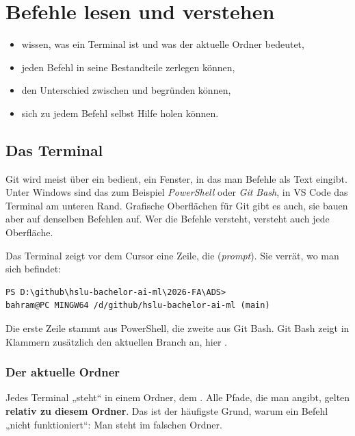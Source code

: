 \chapter{Befehle lesen und verstehen}
\label{kap:lesen}

\begin{lernziele}
\begin{itemize}[nosep]
  \item wissen, was ein Terminal ist und was der aktuelle Ordner bedeutet,
  \item jeden Befehl in seine Bestandteile zerlegen können,
  \item den Unterschied zwischen  und  begründen können,
  \item sich zu jedem Befehl selbst Hilfe holen können.
\end{itemize}
\end{lernziele}

\section{Das Terminal}

Git wird meist über ein  bedient, ein Fenster, in das man Befehle als Text
eingibt. Unter Windows sind das zum Beispiel \emph{PowerShell} oder \emph{Git Bash}, in VS Code
das Terminal am unteren Rand. Grafische Oberflächen für Git gibt es auch, sie bauen aber auf
denselben Befehlen auf. Wer die Befehle versteht, versteht auch jede Oberfläche.

Das Terminal zeigt vor dem Cursor eine Zeile, die 
(\emph{prompt}). Sie verrät, wo man sich befindet:

\begin{lstlisting}[style=ausgabe]
PS D:\github\hslu-bachelor-ai-ml\2026-FA\ADS>
bahram@PC MINGW64 /d/github/hslu-bachelor-ai-ml (main)
\end{lstlisting}

Die erste Zeile stammt aus PowerShell, die zweite aus Git Bash. Git Bash zeigt in Klammern
zusätzlich den aktuellen Branch an, hier .

\subsection*{Der aktuelle Ordner}

Jedes Terminal „steht“ in einem Ordner, dem . Alle
Pfade, die man angibt, gelten \textbf{relativ zu diesem Ordner}. Das ist der häufigste Grund,
warum ein Befehl „nicht funktioniert“: Man steht im falschen Ordner.

